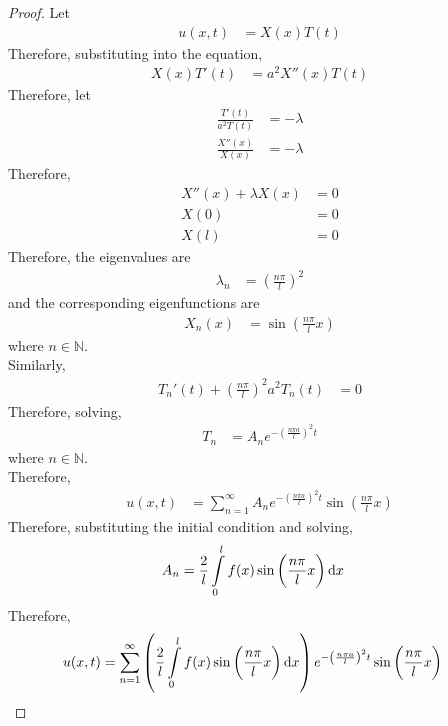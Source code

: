 \documentclass[titlepage, fleqn, a4paper, 12pt, twoside]{article}
\theoremstyle{definition}
\theoremstyle{theorem}
\begin{document}
\begin{proof}
	Let
	\begin{align*}
		u(x,t) & = X(x) T(t)
	\end{align*}
	Therefore, substituting into the equation,
	\begin{align*}
		X(x) T'(t) & = a^2 X''(x) T(t)
	\end{align*}
	Therefore, let
	\begin{align*}
		\frac{T'(t)}{a^2 T(t)} & = -\lambda \\
		\frac{X''(x)}{X(x)}    & = -\lambda
	\end{align*}
	Therefore,
	\begin{align*}
		X''(x) + \lambda X(x) & = 0 \\
		X(0)                  & = 0 \\
		X(l)                  & = 0
	\end{align*}
	Therefore, the eigenvalues are
	\begin{align*}
		\lambda_n & = \left( \frac{n \pi}{l} \right)^2
	\end{align*}
	and the corresponding eigenfunctions are
	\begin{align*}
		X_n(x) & = \sin\left( \frac{n \pi}{l} x \right)
	\end{align*}
	where $n \in \mathbb{N}$.\\
	Similarly,
	\begin{align*}
		{T_n}'(t) + \left( \frac{n \pi}{l} \right)^2 a^2 T_n(t) & = 0
	\end{align*}
	Therefore, solving,
	\begin{align*}
		T_n & = A_n e^{-\left( \frac{n \pi a}{l} \right)^2 t}
	\end{align*}
	where $n \in \mathbb{N}$.\\
	Therefore,
	\begin{align*}
		u(x,t) & = \sum\limits_{n = 1}^{\infty} A_n e^{-\left( \frac{n \pi a}{l} \right)^2 t} \sin\left( \frac{n \pi}{l} x \right)
	\end{align*}
	Therefore, substituting the initial condition and solving,
	\begin{align*}
		A_n & = \frac{2}{l} \int\limits_{0}^{l} f(x) \sin\left( \frac{n \pi}{l} x \right) \dif x
	\end{align*}
	Therefore,
	\begin{align*}
		u(x,t) & = \sum\limits_{n = 1}^{\infty} \left( \frac{2}{l} \int\limits_{0}^{l} f(x) \sin\left( \frac{n \pi}{l} x \right) \dif x \right) e^{-\left( \frac{n \pi a}{l} \right)^2 t} \sin\left( \frac{n \pi}{l} x \right)
	\end{align*}
\end{proof}
\end{document}
